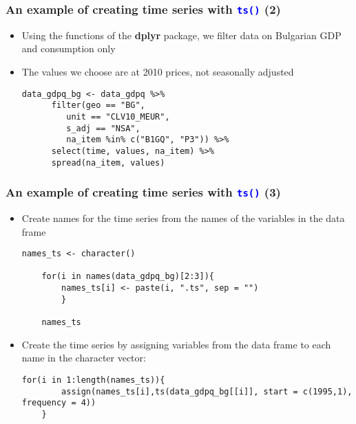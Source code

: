 \documentclass[10pt]{beamer}
\newcommand{\cc}[1]{\texttt{\textcolor{blue}{#1}}}
\theoremstyle{definition}
\begin{document}
\begin{frame}[fragile]
\frametitle{An example of creating time series with \cc{ts()} (2)}
\begin{itemize}
	\item Using the functions of the \textbf{dplyr} package, we filter data on Bulgarian GDP and consumption only
	\item The values we choose are at 2010 prices, not seasonally adjusted
	\begin{lstlisting}[style = rstyle, breaklines]
	data_gdpq_bg <- data_gdpq %>%
	  filter(geo == "BG", 
         unit == "CLV10_MEUR",
         s_adj == "NSA",
         na_item %in% c("B1GQ", "P3")) %>%
	  select(time, values, na_item) %>%
	  spread(na_item, values)
	\end{lstlisting}
\end{itemize}
\end{frame}

\begin{frame}[fragile]
\frametitle{An example of creating time series with \cc{ts()} (3)}
\begin{itemize}
	\item Create names for the time series from the names of the variables in the data frame
	
	\begin{lstlisting}[style = rstyle, breaklines]
	names_ts <- character()

	for(i in names(data_gdpq_bg)[2:3]){
	  	names_ts[i] <- paste(i, ".ts", sep = "")
		}

	names_ts
	\end{lstlisting}

	\item Create the time series by assigning variables from the data frame to each name in the character vector:
	
	\begin{lstlisting}[style = rstyle, breaklines]
	for(i in 1:length(names_ts)){
  		assign(names_ts[i],ts(data_gdpq_bg[[i]], start = c(1995,1), frequency = 4))
	}	
	\end{lstlisting}
\end{itemize}
\end{frame}
\end{document}

